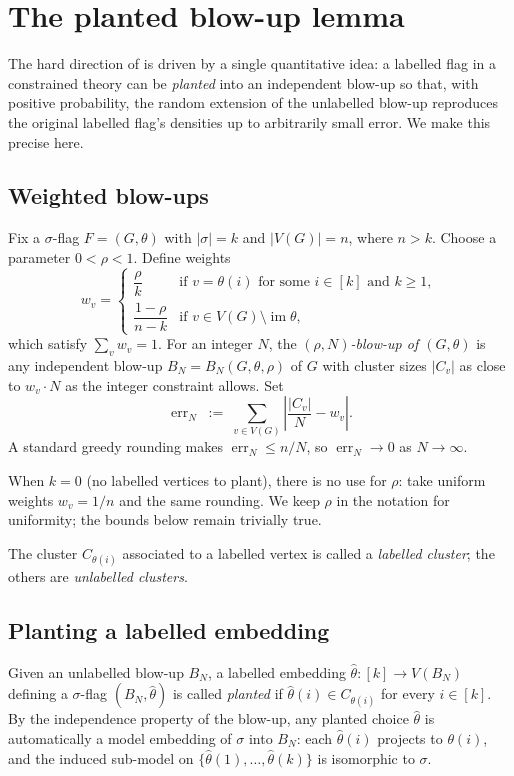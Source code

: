 \documentclass[11pt]{article}
\theoremstyle{definition}
\newcommand{\im}{\operatorname{im}}
\begin{document}
\section{The planted blow-up lemma}\label{sec:blowup}

The hard direction of  is driven by a single
quantitative idea: a labelled flag in a constrained theory can be
\emph{planted} into an independent blow-up so that, with positive
probability, the random extension of the unlabelled blow-up reproduces
the original labelled flag's densities up to arbitrarily small error.
We make this precise here.

\subsection{Weighted blow-ups}

Fix a $\sigma$-flag $F=(G,\theta)$ with $|\sigma|=k$ and $|V(G)|=n$, where
$n>k$.  Choose a parameter $0<\rho<1$.  Define weights
\[
  w_v=
  \begin{cases}
    \dfrac\rho k & \text{if }v=\theta(i)\text{ for some }i\in[k]\text{ and }k\ge 1,\\[1mm]
    \dfrac{1-\rho}{n-k} & \text{if }v\in V(G)\setminus\im\theta,
  \end{cases}
\]
which satisfy $\sum_v w_v=1$.  For an integer $N$, the
\emph{$(\rho,N)$-blow-up of $(G,\theta)$} is any independent blow-up
$B_N=B_N(G,\theta,\rho)$ of $G$ with cluster sizes $|C_v|$ as close to
$w_v\cdot N$ as the integer constraint allows.  Set
\[
  \operatorname{err}_N
  \;:=\;
  \sum_{v\in V(G)}\left\lvert\frac{|C_v|}{N}-w_v\right\rvert.
\]
A standard greedy rounding makes $\operatorname{err}_N\le n/N$, so
$\operatorname{err}_N\to 0$ as $N\to\infty$.

When $k=0$ (no labelled vertices to plant), there is no use for $\rho$:
take uniform weights $w_v=1/n$ and the same rounding.  We keep $\rho$ in
the notation for uniformity; the bounds below remain trivially true.

The cluster $C_{\theta(i)}$ associated to a labelled vertex is called a
\emph{labelled cluster}; the others are \emph{unlabelled clusters}.

\subsection{Planting a labelled embedding}

Given an unlabelled blow-up $B_N$, a labelled embedding
$\widehat\theta\colon[k]\to V(B_N)$ defining a $\sigma$-flag
$(B_N,\widehat\theta)$ is called \emph{planted} if
$\widehat\theta(i)\in C_{\theta(i)}$ for every $i\in[k]$.
By the independence property of the blow-up, any planted choice
$\widehat\theta$ is automatically a model embedding of $\sigma$ into
$B_N$: each $\widehat\theta(i)$ projects to $\theta(i)$, and the induced
sub-model on $\{\widehat\theta(1),\ldots,\widehat\theta(k)\}$ is
isomorphic to $\sigma$.
\end{document}
